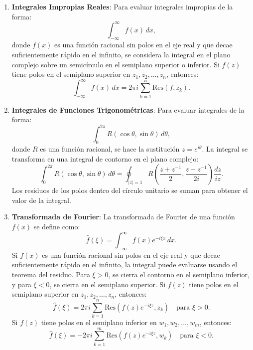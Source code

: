 \documentclass[letterpaper]{book}
\begin{document}
\begin{enumerate}
\item \textbf{Integrales Impropias Reales}:
Para evaluar integrales impropias de la forma:
\[
\int_{-\infty}^\infty f(x) \, dx,
\]
donde \(f(x)\) es una función racional sin polos en el eje real y que decae suficientemente rápido en el infinito, se considera la integral en el plano complejo sobre un semicírculo en el semiplano superior o inferior. Si \(f(z)\) tiene polos en el semiplano superior en \(z_1, z_2, \dots, z_n\), entonces:
\[
\int_{-\infty}^\infty f(x) \, dx = 2\pi i \sum_{k=1}^n \text{Res}(f, z_k).
\]

\item \textbf{Integrales de Funciones Trigonométricas}:
Para evaluar integrales de la forma:
\[
\int_0^{2\pi} R(\cos \theta, \sin \theta) \, d\theta,
\]
donde \(R\) es una función racional, se hace la sustitución \(z = e^{i\theta}\). La integral se transforma en una integral de contorno en el plano complejo:
\[
\int_0^{2\pi} R(\cos \theta, \sin \theta) \, d\theta = \oint_{|z|=1} R\left( \frac{z + z^{-1}}{2}, \frac{z - z^{-1}}{2i} \right) \frac{dz}{iz}.
\]
Los residuos de los polos dentro del círculo unitario se suman para obtener el valor de la integral.

\item \textbf{Transformada de Fourier}:
La transformada de Fourier de una función \(f(x)\) se define como:
\begin{equation}
\hat{f}(\xi) = \int_{-\infty}^\infty f(x) e^{-i \xi x} \, dx.
\end{equation}
Si \(f(x)\) es una función racional sin polos en el eje real y que decae suficientemente rápido en el infinito, la integral puede evaluarse usando el teorema del residuo. Para \(\xi > 0\), se cierra el contorno en el semiplano inferior, y para \(\xi < 0\), se cierra en el semiplano superior. Si \(f(z)\) tiene polos en el semiplano superior en \(z_1, z_2, \dots, z_n\), entonces:
\[
\hat{f}(\xi) = 2\pi i \sum_{k=1}^n \text{Res}(f(z) e^{-i \xi z}, z_k) \quad \text{para } \xi > 0.
\]
Si \(f(z)\) tiene polos en el semiplano inferior en \(w_1, w_2, \dots, w_m\), entonces:
\[
\hat{f}(\xi) = -2\pi i \sum_{k=1}^m \text{Res}(f(z) e^{-i \xi z}, w_k) \quad \text{para } \xi < 0.
\]
\end{enumerate}
\end{document}
